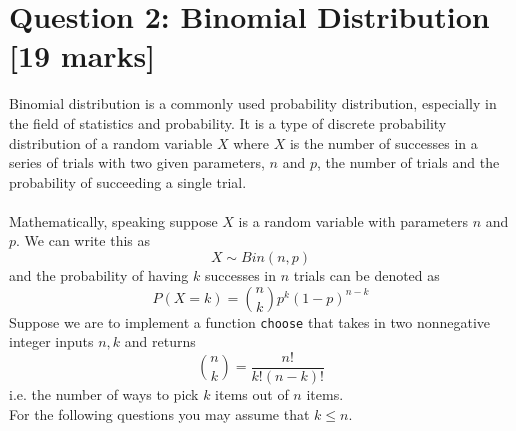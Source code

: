 \newpage
\section{Question 2: Binomial Distribution [19 marks]}
Binomial distribution is a commonly used probability distribution, especially in the field of statistics 
and probability. It is a type of discrete probability distribution of a random variable $X$ where $X$ 
is the number of successes in a series of trials with two given parameters, $n$ and $p$, the 
number of trials and the probability of succeeding a single trial. \\ \\
Mathematically, speaking suppose $X$ is a random variable with parameters $n$ and $p$. We can 
write this as
\[X \sim Bin(n,p)\]
and the probability of having $k$ successes in $n$ trials can be denoted as
\[P(X = k) = \binom{n}{k}p^k(1-p)^{n-k}\]
Suppose we are to implement a function \colorbox{CornflowerBlue!20}{\texttt{choose}} that takes in two nonnegative integer inputs $n, k$
and returns
\[\binom{n}{k} = \frac{n!}{k!(n-k)!}\]
i.e. the number of ways to pick $k$ items out of $n$ items. \\
For the following questions you may assume that $k \le n$.
